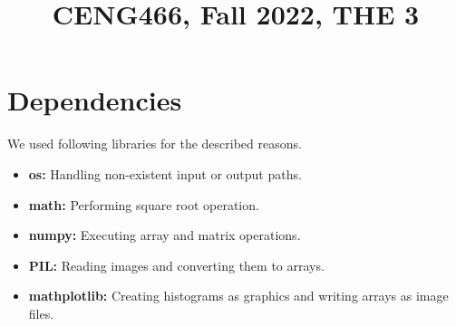 \documentclass[conference]{IEEEtran}
\begin{document}
\title{CENG466, Fall 2022, THE 3\\

}

\author{
\and
{}
}

\maketitle

\begin{abstract}

\end{abstract}

\begin{IEEEkeywords}

\end{IEEEkeywords}



\section{Dependencies}
We used following libraries for the described reasons.
\begin{itemize}
	\item \textbf{os:} Handling non-existent input or output paths.
	\item \textbf{math:} Performing square root operation.
	\item \textbf{numpy:} Executing array and matrix operations.
	\item \textbf{PIL:} Reading images and converting them to arrays.
	\item \textbf{mathplotlib:} Creating histograms as graphics and writing arrays as image files.
\end{itemize}
\end{document}
